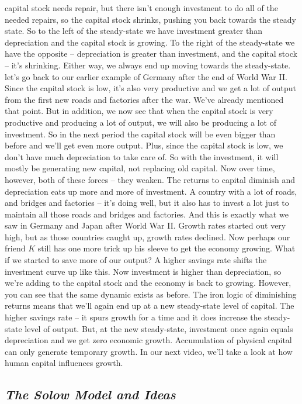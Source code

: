 {capital stock needs repair, but there isn't enough investment to do all of the needed repairs, so the capital stock shrinks, pushing you back towards the
steady state. So to the left of the steady-state we have investment greater than depreciation and the capital stock is growing. To the right of the steady-state we have
the opposite -- depreciation is greater than investment, and the capital stock -- it's shrinking. Either way, we always end up moving towards the steady-state. let's go back to our earlier example of Germany after the end of World War II. Since the capital stock is low, it's also very productive and we get a
lot of output from the first new roads and factories after the war. We've already mentioned that point. But in addition, we now see that when the capital
stock is very productive and producing a lot of output, we will also be producing a lot of investment. So in the next period the capital stock will be even
bigger than before and we'll get even more output. Plus, since the capital stock is low, we don't have much depreciation to take care of. So with the
investment, it will mostly be generating new capital, not replacing old capital. Now over time, however, both of these forces -- they weaken. The returns
to capital diminish and depreciation eats up more and more of investment. A country with a lot of roads, and bridges and factories -- it's doing well, but it
also has to invest a lot just to maintain all those roads and bridges and factories. And this is exactly what we saw in Germany and Japan after World War
II. Growth rates started out very high, but as those countries caught up, growth rates declined. Now perhaps our friend $K$ still has one more trick up his
sleeve to get the economy growing. What if we started to save more of our output? A higher savings rate shifts the investment curve up like this. Now
investment is higher than depreciation, so we're adding to the capital stock and the economy is back to growing. However, you can see that the same
dynamic exists as before. The iron logic of diminishing returns means that we'll again end up at a new steady-state level of capital. The higher savings
rate -- it spurs growth for a time and it does increase the steady-state level of output. But, at the new steady-state, investment once again equals
depreciation and we get zero economic growth. Accumulation of physical capital can only generate temporary growth. In our next video, we'll take a look
at how human capital influences growth.
	}

\subsection{\tv \textit{The Solow Model and Ideas}}


